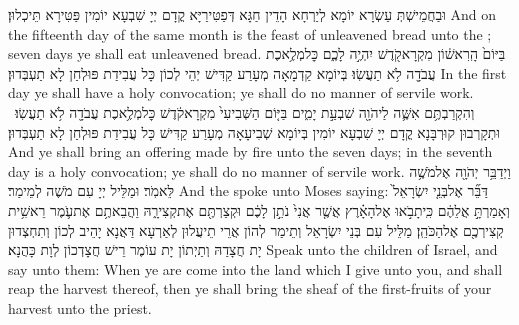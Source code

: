 {וּבַחֲמֵישְׁתְּ עַשְׂרָא יוֹמָא לְיַרְחָא הָדֵין חַגָּא דְּפַטִּירַיָּא קֳדָם יְיָ שִׁבְעָא יוֹמִין פַּטִּירָא תֵּיכְלוּן׃}
{And on the fifteenth day of the same month is the feast of unleavened bread unto the \lord; seven days ye shall eat unleavened bread.}{}
{בַּיּוֹם֙ הָֽרִאשׁ֔וֹן מִקְרָא\maqqaf קֹ֖דֶשׁ יִהְיֶ֣ה לָכֶ֑ם כׇּל\maqqaf מְלֶ֥אכֶת עֲבֹדָ֖ה לֹ֥א תַעֲשֽׂוּ׃}
{בְּיוֹמָא קַדְמָאָה מְעָרַע קַדִּישׁ יְהֵי לְכוֹן כָּל עֲבִידַת פּוּלְחַן לָא תַעְבְּדוּן׃}
{In the first day ye shall have a holy convocation; ye shall do no manner of servile work.}{}
{וְהִקְרַבְתֶּ֥ם אִשֶּׁ֛ה לַיהֹוָ֖ה שִׁבְעַ֣ת יָמִ֑ים בַּיּ֤וֹם הַשְּׁבִיעִי֙ מִקְרָא\maqqaf קֹ֔דֶשׁ כׇּל\maqqaf מְלֶ֥אכֶת עֲבֹדָ֖ה לֹ֥א תַעֲשֽׂוּ׃ \petucha }
{וּתְקָרְבוּן קוּרְבָּנָא קֳדָם יְיָ שִׁבְעָא יוֹמִין בְּיוֹמָא שְׁבִיעָאָה מְעָרַע קַדִּישׁ כָּל עֲבִידַת פּוּלְחַן לָא תַעְבְּדוּן׃}
{And ye shall bring an offering made by fire unto the \lord\space seven days; in the seventh day is a holy convocation; ye shall do no manner of servile work.}{}
\threeverse{\seder{[יט]}}%
{וַיְדַבֵּ֥ר יְהֹוָ֖ה אֶל\maqqaf מֹשֶׁ֥ה לֵּאמֹֽר׃}
{וּמַלֵּיל יְיָ עִם מֹשֶׁה לְמֵימַר׃}
{And the \lord\space spoke unto Moses saying:}{}
{דַּבֵּ֞ר אֶל\maqqaf בְּנֵ֤י יִשְׂרָאֵל֙ וְאָמַרְתָּ֣ אֲלֵהֶ֔ם כִּֽי\maqqaf תָבֹ֣אוּ אֶל\maqqaf הָאָ֗רֶץ אֲשֶׁ֤ר אֲנִי֙ נֹתֵ֣ן לָכֶ֔ם וּקְצַרְתֶּ֖ם אֶת\maqqaf קְצִירָ֑הּ וַהֲבֵאתֶ֥ם אֶת\maqqaf עֹ֛מֶר רֵאשִׁ֥ית קְצִירְכֶ֖ם אֶל\maqqaf הַכֹּהֵֽן׃}
{מַלֵּיל עִם בְּנֵי יִשְׂרָאֵל וְתֵימַר לְהוֹן אֲרֵי תֵיעֲלוּן לְאַרְעָא דַּאֲנָא יָהֵיב לְכוֹן וְתִחְצְדוּן יָת חֲצָדַהּ וְתַיְתוֹן יָת עוֹמֶר רֵישׁ חֲצָדְכוֹן לְוָת כָּהֲנָא׃}
{Speak unto the children of Israel, and say unto them: When ye are come into the land which I give unto you, and shall reap the harvest thereof, then ye shall bring the sheaf of the first-fruits of your harvest unto the priest.}{}
